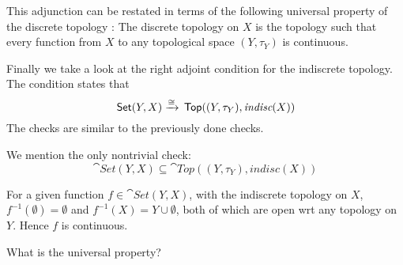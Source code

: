 \begin{frame}
    
This adjunction can be restated in terms of the following universal property of
the discrete topology : The discrete topology on \(X\) is the topology such that
every function from \(X\) to any topological space \( (Y, \tau_Y)\) is continuous. 


\begin{center}
\end{center}


\end{frame}

\begin{frame}

    \begin{center}
    \end{center}

    Finally we take a look at the right adjoint condition for the indiscrete
    topology. The condition states that 
    \begin{equation}
         \,\textsf{Set}(Y,X ) \xrightarrow{\cong} \,\textsf{Top}((Y, \tau_Y) ,\textit{indisc}(X))
    \end{equation}
    The checks are similar to the previously done checks.

\end{frame}

\begin{frame}

    We mention the only nontrivial check: 
    \begin{equation}
        \cat{Set}(Y,X ) \subseteq\cat{Top}((Y, \tau_Y) ,\textit{indisc}(X))
    \end{equation}

    For a given function \(f \in   \cat{Set}(Y,X )\), with the indiscrete
    topology on \(X\), \(f^{-1}(\emptyset) = \emptyset\) and \(f^{-1}(X) = Y
    \cup \emptyset\), both of which are open wrt any topology on \(Y\). Hence
    \(f\) is continuous. 

    What is the universal property? 

\end{frame}
